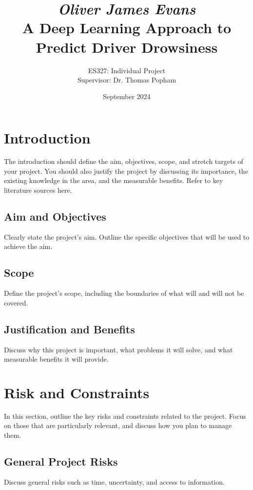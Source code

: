 \documentclass[a4paper, 11pt, twocolumn]{article}
\title{
    \textit{\large Oliver James Evans} \\ %
    \textbf{\LARGE A Deep Learning Approach to Predict Driver Drowsiness} %
}
\author{
    \normalsize ES327: Individual Project \\ %
    \normalsize Supervisor: Dr. Thomas Popham %
}
\date{
    \normalsize September 2024 %
}
\begin{document}
\maketitle

\section{Introduction}
\label{sec:introduction}
The introduction should define the aim, objectives, scope, and stretch targets of your project. You should also justify the project by discussing its importance, the existing knowledge
 in the area, and the measurable benefits. Refer to key literature sources here.
\subsection{Aim and Objectives}
Clearly state the project's aim. Outline the specific objectives that will be used to achieve the aim.

\subsection{Scope}
Define the project’s scope, including the boundaries of what will and will not be covered.

\subsection{Justification and Benefits}
Discuss why this project is important, what problems it will solve, and what measurable benefits it will provide.

\section{Risk and Constraints}
\label{sec:risks}
In this section, outline the key risks and constraints related to the project. Focus on those that are particularly relevant, and discuss how you plan to manage them.

\subsection{General Project Risks}
Discuss general risks such as time, uncertainty, and access to information.
\end{document}

